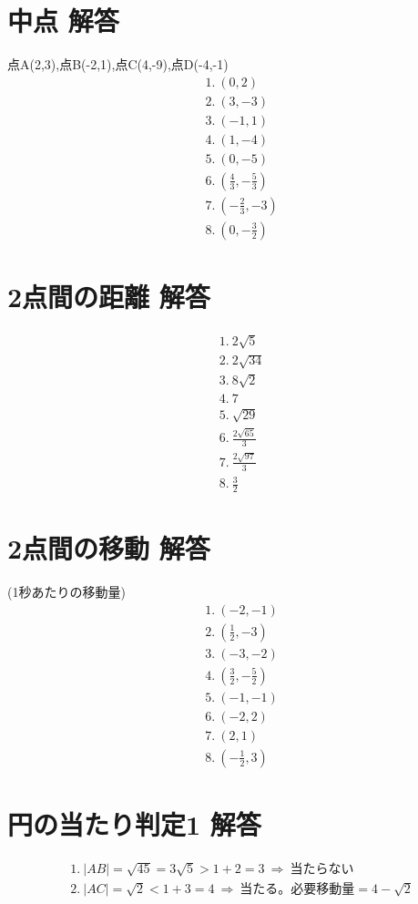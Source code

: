 \documentclass[paper=b4j,landscape,twocolumn,fleqn]{jlreq}
\begin{document}
\section{中点 解答}
点A(2,3),点B(-2,1),点C(4,-9),点D(-4,-1)
\begin{align*}
&1.\ (0,2)\\
&2.\ (3,-3)\\
&3.\ (-1,1)\\
&4.\ (1,-4)\\
&5.\ (0,-5)\\
&6.\ \left(\frac{4}{3},-\frac{5}{3}\right)\\
&7.\ \left(-\frac{2}{3},-3\right)\\
&8.\ \left(0,-\frac{3}{2}\right)
\end{align*}

\section{2点間の距離 解答}
\begin{align*}
&1.\ 2\sqrt{5}\\
&2.\ 2\sqrt{34}\\
&3.\ 8\sqrt{2}\\
&4.\ 7\\
&5.\ \sqrt{29}\\
&6.\ \frac{2\sqrt{65}}{3}\\
&7.\ \frac{2\sqrt{97}}{3}\\
&8.\ \frac{3}{2}
\end{align*}

\newpage
\section{2点間の移動 解答}
(1秒あたりの移動量)
\begin{align*}
&1.\ (-2,-1)\\
&2.\ \left(\frac{1}{2},-3\right)\\
&3.\ (-3,-2)\\
&4.\ \left(\frac{3}{2},-\frac{5}{2}\right)\\
&5.\ (-1,-1)\\
&6.\ (-2,2)\\
&7.\ (2,1)\\
&8.\ \left(-\frac{1}{2},3\right)
\end{align*}

\section{円の当たり判定1 解答}
\begin{align*}
&1.\ |AB|=\sqrt{45}=3\sqrt{5}>1+2=3\ \Rightarrow\ \text{当たらない}\\
&2.\ |AC|=\sqrt{2}<1+3=4\ \Rightarrow\ \text{当たる。必要移動量}=4-\sqrt{2}
\end{align*}
\end{document}
